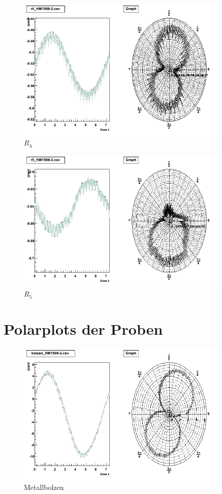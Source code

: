 \begin{appendix}
\begin{figure}[H]
	\centering \includegraphics[width=0.9\textwidth]{Auswertung/widerstaende-polar/r4.png}
	\caption{$R_4$}
\end{figure}

\begin{figure}[H]
	\centering \includegraphics[width=0.9\textwidth]{Auswertung/widerstaende-polar/r5.png}
	\caption{$R_5$}
\end{figure}


\section{Polarplots der Proben}

\begin{figure}[H]
	\centering \includegraphics[width=0.9\textwidth]{Auswertung/Proben-polar/bolzen.png}
	\caption{Metallbolzen}
\end{figure}


\end{appendix}
